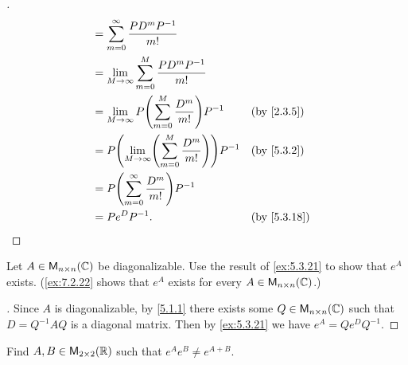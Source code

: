 \begin{proof}[]
\begin{align*}
        & = \sum_{m = 0}^\infty \dfrac{P D^m P^{-1}}{m!}                                           \\
        & = \Lim_{M \to \infty} \sum_{m = 0}^M \dfrac{P D^m P^{-1}}{m!}                            \\
        & = \Lim_{M \to \infty} P \pa{\sum_{m = 0}^M \dfrac{D^m}{m!}} P^{-1}      &  & \by{2.3.5}  \\
        & = P \pa{\Lim_{M \to \infty} \pa{\sum_{m = 0}^M \dfrac{D^m}{m!}}} P^{-1} &  & \by{5.3.2}  \\
        & = P \pa{\sum_{m = 0}^\infty \dfrac{D^m}{m!}} P^{-1}                                      \\
        & = P e^D P^{-1}.                                                         &  & \by{5.3.18}
  \end{align*}
\end{proof}

\begin{ex}\label{ex:5.3.22}
  Let \(A \in \ms[n][n][\C]\) be diagonalizable.
  Use the result of \cref{ex:5.3.21} to show that \(e^A\) exists.
  (\cref{ex:7.2.22} shows that \(e^A\) exists for every \(A \in \ms[n][n][\C]\).)
\end{ex}

\begin{proof}[]
  Since \(A\) is diagonalizable, by \cref{5.1.1} there exists some \(Q \in \ms[n][n][\C]\) such that \(D = Q^{-1} A Q\) is a diagonal matrix.
  Then by \cref{ex:5.3.21} we have \(e^A = Q e^D Q^{-1}\).
\end{proof}

\begin{ex}\label{ex:5.3.23}
  Find \(A, B \in \ms[2][2][\R]\) such that \(e^A e^B \neq e^{A + B}\).
\end{ex}

